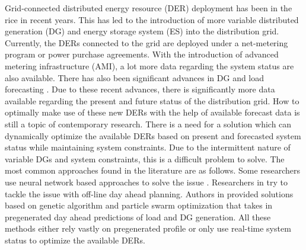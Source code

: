 Grid-connected distributed energy resource (DER) deployment has been in the rice in recent years. This has led to the introduction of more variable distributed generation (DG) and energy storage system (ES) into the distribution grid. Currently, the DERs connected to the grid are deployed under a net-metering program or power purchase agreements. With the introduction of advanced metering infrastructure (AMI), a lot more data regarding the system status are also available. There has also been significant advances in DG and load forecasting \cite{LOAD_FOR1,LOAD_FOR2,LOAD_FOR3,WInd_for_1,ospina2019forecasting}. Due to these recent advances, there is significantly more data available regarding the present and future status of the distribution grid. How to optimally make use of these new DERs with the help of available forecast data is still a topic of contemporary research. There is a need for a solution which can dynamically optimize the available DERs based on present and forecasted system status while maintaining system constraints. Due to the intermittent nature of variable DGs and system constraints, this is a difficult problem to solve. The most common approaches found in the literature are as follows. Some researchers use neural network based approaches to solve the issue \cite{OFF_LINE_1}. Researchers in \cite{off_2,off_3,off_4} try to tackle the issue with off-line day ahead planning. Authors in \cite{ANEW1,ANEW2,ANEW3} provided solutions based on genetic algorithm and particle swarm optimization that takes in pregenerated day ahead predictions of load and DG generation. All these methods either rely vastly on pregenerated profile or only use real-time system status to optimize the available DERs. 

